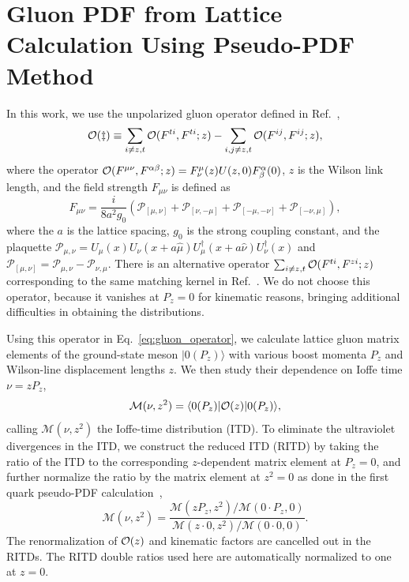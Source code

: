\section{Gluon PDF from Lattice Calculation Using Pseudo-PDF Method}\label{sec:cal-details}

In this work, we use the unpolarized gluon operator defined in Ref.~\cite{Balitsky:2019krf},
%
\begin{equation}\label{eq:gluon_operator}
 {\cal O(z)}\equiv\sum_{i\neq z,t}{\cal O}(F^{ti},F^{ti};z)-\sum_{i,j\neq z,t}{\cal O}(F^{ij},F^{ij};z),
\end{equation}
%
where the operator ${\cal O}(F^{\mu\nu}, F^{\alpha\beta};z) = F^\mu_\nu(z)U(z,0)F^{\alpha}_{\beta}(0)$, $z$ is the Wilson link length, and the field strength $F_{\mu\nu}$ is defined as
%
\begin{equation}\label{}
 F_{\mu\nu} = \frac{i}{8a^2g_0}\left(\mathcal{P}_{[\mu,\nu]}+\mathcal{P}_{[\nu,-\mu]}+\mathcal{P}_{[-\mu,-\nu]}+\mathcal{P}_{[-\nu,\mu]}\right),
\end{equation}
%
where the $a$ is the lattice spacing,
$g_0$ is the strong coupling constant,
and the plaquette $\mathcal{P_{\mu,\nu}}=U_{\mu}(x)U_{\nu}(x+a\hat{\mu})U^{\dag}_{\mu}(x+a\hat{\nu})U^{\dag}_{\nu}(x)$ and $\mathcal{P_{[\mu,\nu]}}=\mathcal{P}_{\mu,\nu}-\mathcal{P}_{\nu,\mu}$.
There is an alternative operator $\sum_{i\neq z,t}{\cal O}(F^{ti},F^{zi};z)$ corresponding to the same matching kernel in Ref.~\cite{Balitsky:2019krf}.
We do not choose this operator, because it vanishes at $P_z=0$ for kinematic reasons, bringing additional difficulties in obtaining the distributions.

Using this operator in Eq.~\ref{eq:gluon_operator}, we calculate lattice gluon matrix elements of the ground-state meson $|0 (P_z) \rangle$ with various boost momenta $P_z$ and Wilson-line displacement lengths $z$.
We then study their dependence on Ioffe time $\nu=zP_z$,
%
\begin{equation}
\mathcal{M}(\nu,z^2) = \langle 0 (P_z)|{\cal O}(z)|0 (P_z)\rangle,
\label{eq:ME_unpol}
\end{equation}
%
calling $\mathcal{M}(\nu,z^2)$ the Ioffe-time distribution (ITD).
To eliminate the ultraviolet divergences in the ITD, we construct the reduced ITD (RITD) by taking the ratio of the ITD to the corresponding $z$-dependent matrix element at $P_z=0$, and further normalize the ratio by the matrix element at $z^2=0$ as done in the first quark pseudo-PDF calculation~\cite{Orginos:2017kos},
%
\begin{equation}
\mathscr{M}(\nu,z^2)=
\frac{\mathcal{M}(zP_z,z^2)/\mathcal{M}(0\cdot P_z,0)}{\mathcal{M}(z\cdot 0,z^2)/\mathcal{M}(0\cdot 0,0)}.
\label{eq:RITD}
\end{equation}
%
The renormalization of ${\cal O}(z)$ and kinematic factors are cancelled out in the RITDs.
The RITD double ratios used here are automatically normalized to one at $z=0$.

